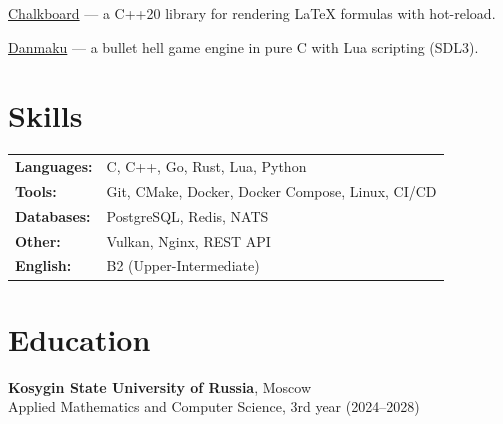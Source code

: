 \documentclass[a4paper,11pt]{article}
\begin{document}
\href{https://github.com/koftamainee/chalkboard}{Chalkboard} --- a C++20 library for rendering LaTeX formulas with hot-reload.

\href{https://github.com/koftamainee/danmaku}{Danmaku} --- a bullet hell game engine in pure C with Lua scripting (SDL3).

\section{Skills}

\begin{tabular}{@{}ll}
\textbf{Languages:} & C, C++, Go, Rust, Lua, Python \\
\textbf{Tools:} & Git, CMake, Docker, Docker Compose, Linux, CI/CD \\
\textbf{Databases:} & PostgreSQL, Redis, NATS \\
\textbf{Other:} & Vulkan, Nginx, REST API \\
\textbf{English:} & B2 (Upper-Intermediate) \\
\end{tabular}

\section{Education}

  \textbf{Kosygin State University of Russia}, Moscow \\
  Applied Mathematics and Computer Science, 3rd year (2024--2028)
\end{document}
